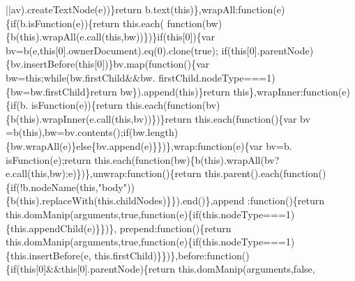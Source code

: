 \begin{DoxyCode}
      ||av).createTextNode(e))\}\textcolor{keywordflow}{return} b.text(\textcolor{keyword}{this})\},wrapAll:\textcolor{keyword}{function}(e)\{\textcolor{keywordflow}{if}(b.isFunction(e))\{\textcolor{keywordflow}{return} this.each(\textcolor{keyword}{
      function}(bw)\{b(\textcolor{keyword}{this}).wrapAll(e.call(\textcolor{keyword}{this},bw))\})\}\textcolor{keywordflow}{if}(\textcolor{keyword}{this}[0])\{var bv=b(e,\textcolor{keyword}{this}[0].ownerDocument).eq(0).clone(\textcolor{keyword}{true});\textcolor{keywordflow}{
      if}(\textcolor{keyword}{this}[0].parentNode)\{bv.insertBefore(\textcolor{keyword}{this}[0])\}bv.map(\textcolor{keyword}{function}()\{var bw=\textcolor{keyword}{this};\textcolor{keywordflow}{while}(bw.firstChild&&bw.
      firstChild.nodeType===1)\{bw=bw.firstChild\}\textcolor{keywordflow}{return} bw\}).append(\textcolor{keyword}{this})\}\textcolor{keywordflow}{return} \textcolor{keyword}{this}\},wrapInner:\textcolor{keyword}{function}(e)\{\textcolor{keywordflow}{if}(b.
      isFunction(e))\{\textcolor{keywordflow}{return} this.each(\textcolor{keyword}{function}(bv)\{b(\textcolor{keyword}{this}).wrapInner(e.call(\textcolor{keyword}{this},bv))\})\}\textcolor{keywordflow}{return} this.each(\textcolor{keyword}{function}()\{var bv
      =b(\textcolor{keyword}{this}),bw=bv.contents();\textcolor{keywordflow}{if}(bw.length)\{bw.wrapAll(e)\}\textcolor{keywordflow}{else}\{bv.append(e)\}\})\},wrap:\textcolor{keyword}{function}(e)\{var bv=b.
      isFunction(e);\textcolor{keywordflow}{return} this.each(\textcolor{keyword}{function}(bw)\{b(\textcolor{keyword}{this}).wrapAll(bv?e.call(\textcolor{keyword}{this},bw):e)\})\},unwrap:\textcolor{keyword}{function}()\{\textcolor{keywordflow}{return} 
      this.parent().each(\textcolor{keyword}{function}()\{\textcolor{keywordflow}{if}(!b.nodeName(\textcolor{keyword}{this},\textcolor{stringliteral}{"body"}))\{b(\textcolor{keyword}{this}).replaceWith(this.childNodes)\}\}).end()\},append
      :\textcolor{keyword}{function}()\{\textcolor{keywordflow}{return} this.domManip(arguments,\textcolor{keyword}{true},\textcolor{keyword}{function}(e)\{\textcolor{keywordflow}{if}(this.nodeType===1)\{this.appendChild(e)\}\})\},
      prepend:\textcolor{keyword}{function}()\{\textcolor{keywordflow}{return} this.domManip(arguments,\textcolor{keyword}{true},\textcolor{keyword}{function}(e)\{\textcolor{keywordflow}{if}(this.nodeType===1)\{this.insertBefore(e,
      this.firstChild)\}\})\},before:\textcolor{keyword}{function}()\{\textcolor{keywordflow}{if}(\textcolor{keyword}{this}[0]&&\textcolor{keyword}{this}[0].parentNode)\{\textcolor{keywordflow}{return} this.domManip(arguments,\textcolor{keyword}{false},\textcolor{keyword}{
}
\end{DoxyCode}
